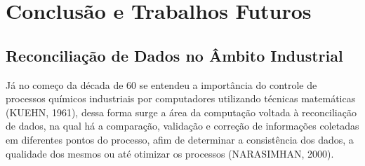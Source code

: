 
\chapter{Conclusão e Trabalhos Futuros}\label{conclusao}
\section{Reconciliação de Dados no Âmbito Industrial}

Já no começo da década de 60 se entendeu a importância do controle de processos químicos industriais por computadores utilizando técnicas matemáticas (KUEHN, 1961), dessa forma surge a área da computação voltada à reconciliação de dados, na qual há a comparação, validação e correção de informações coletadas em diferentes pontos do processo, afim de determinar a consistência dos dados, a qualidade dos mesmos ou até otimizar os processos (NARASIMHAN, 2000).
